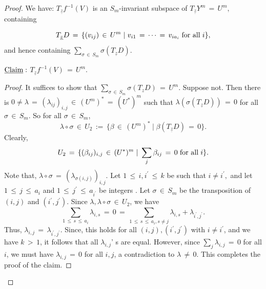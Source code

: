 \documentclass[12pt,reqno]{amsart}
\theoremstyle{definition}
\numberwithin{equation}{section}
\begin{document}
\begin{proof}
We have: $ T_{\underline{z}} f^{-1}(V)$ is an $S_{m}$-invariant subspace of $ T_{\underline{z}}Y^{m}\,=\, U^{m},$ containing 

$$ T_{\underline{z}}D\,=\, \{ (v_{ij})\,\in\, U^{m} \hspace{3pt} | \hspace{3pt} v_{i1}\,=\,\cdots \,=\,v_{ia_{i}} \hspace{3pt} \textnormal{for all}  \hspace{3pt} i \},$$ and hence containing $ \sum_{\sigma\,\in\, S_{m}}\sigma(T_{\underline{z}}D).$

$\underline{\textnormal{Claim}}:$ $ T_{\underline{z}}f^{-1}(V)\,=\, U^{m}.$
\begin{proof}
It suffices to show that $\sum_{\sigma\, \in\, S_{m}} \sigma(T_{z}D)\, =\, U^{m}.$ Suppose not. Then there is $ 0 \neq \lambda \,=\, (\lambda_{ij})_{i,j}\, \in\, (U^{m})^{\ast}\,=\, (U^{\ast})^{m}$ such that $ \lambda (\sigma(T_{\underline{z}}D))\, =\,0$ for all $\sigma\, \in\, S_{m}.$ So for all $\sigma\, \in\, S_{m}$, 
     $$ \lambda \circ \sigma \,\in\, U_{2}\,:=\, \{ \beta\, \in\, (U^{m})^{\ast} \hspace{3pt} | \hspace{3pt} \beta (T_{\underline{z}}D)\,=\,0 \}.$$
Clearly,
     $$ U_{2}\,=\, \{ (\beta_{ij})_{i,j}\,\in\, (U^{\ast})^{m} \hspace{3pt} | \hspace{3pt} \sum_{j}\beta_{ij}\,=\,0  \hspace{3pt} \textnormal{for all} \hspace{3pt} i \}.$$
     Note that, $ \lambda \circ \sigma\, =\, (\lambda _{\sigma(i,j)})_{i,j}.$ Let $ 1 \,\leq\, i,i^{\prime}\, \leq\, k$ be such that $ i \neq i^{\prime},$ and let $ 1 \,\leq\, j \,\leq\, a_{i}$ and $1\,\leq\, j^{\prime}\, \leq\, a_{i^{\prime}}$ be integers . Let $ \sigma\, \in\, S_{m}$ be the transposition of $ (i,j)$ and $(i^{\prime},j^{\prime}) .$ Since $ \lambda, \lambda \circ \sigma \, \in\, U_{2}$, we have $$ \sum _{1\, \leq\, s\, \leq\, a_{i}} \lambda_{i,s}\,=\,0 \,=\, \sum_{1\,\leq\, s \,\leq\, a_{i}, s\neq j} \lambda_{i,s} +\lambda_{i^{\prime},j^{\prime}}.$$ Thus, $ \lambda_{i,j}\, =\, \lambda_{i^{\prime},j^{\prime}}.$ Since, this holds for all $(i,j),(i^{\prime},j^{\prime})$ with $ i \neq i^{\prime}$, and we have $ k\,>\,1$, it follows that  all $ \lambda_{i,j}$' s are equal. However, since $ \sum_{j}\lambda_{i,j}\,=\,0 $ for all $i$, we must have $ \lambda_{i,j}\,=\,0 $ for all $ i,j$, a contradiction to $ \lambda \,\neq\, 0 $.   
     This completes the proof of the claim.
\end{proof}     


\end{proof}
\end{document}
